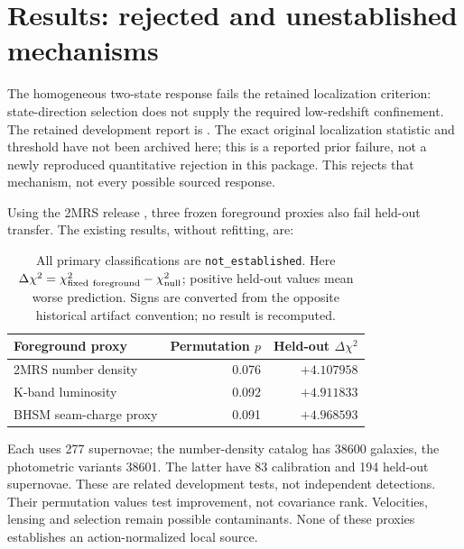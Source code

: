 \section{Results: rejected and unestablished mechanisms}
\label{sec:negative-results}
The homogeneous two-state response fails the retained localization
criterion: state-direction selection does not supply the required
low-redshift confinement. The retained development report is
.
The exact original localization statistic and threshold have not been
archived here; this is a reported prior failure, not a newly reproduced
quantitative rejection in this package.
This rejects that mechanism, not every possible sourced response.

Using the 2MRS release \citep{Huchra2012}, three frozen foreground proxies also fail held-out transfer.
The existing results, without refitting, are:
\begin{table}[htbp]
\centering
\begin{tabular}{@{}lrr@{}}
\toprule
Foreground proxy & Permutation $p$ & Held-out $\Delta\chi^2$\\
\midrule
2MRS number density & 0.076 & $+4.107958$\\
K-band luminosity & 0.092 & $+4.911833$\\
BHSM seam-charge proxy & 0.091 & $+4.968593$\\
\bottomrule
\end{tabular}
\caption{All primary classifications are \texttt{not\_established}.
Here $\Delta\chi^2=\chi^2_{\rm fixed\ foreground}-\chi^2_{\rm null}$;
positive held-out values mean worse prediction. Signs are converted from
the opposite historical artifact convention; no result is recomputed.}
\label{tab:negative-transfer}
\end{table}
Each uses 277 supernovae; the number-density catalog has 38600 galaxies,
the photometric variants 38601. The latter have 83 calibration and 194
held-out supernovae. These are related development tests, not independent
detections. Their permutation values test improvement, not covariance rank.
Velocities, lensing and selection remain possible contaminants. None of
these proxies establishes an action-normalized local source.
